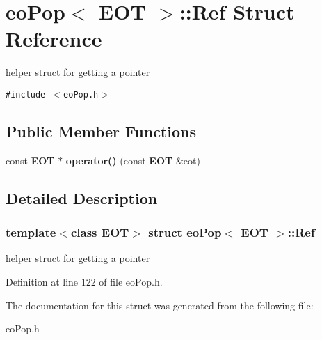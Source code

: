\section{eo\-Pop$<$ EOT $>$::Ref Struct Reference}
\label{structeo_pop_1_1_ref}
helper struct for getting a pointer  


{\tt \#include $<$eo\-Pop.h$>$}

\subsection*{Public Member Functions}
\begin{CompactItemize}
\item 
const {\bf EOT} $\ast$ {\bf operator()} (const {\bf EOT} \&eot)\label{structeo_pop_1_1_ref_a0}

\end{CompactItemize}


\subsection{Detailed Description}
\subsubsection*{template$<$class EOT$>$ struct eo\-Pop$<$ EOT $>$::Ref}

helper struct for getting a pointer 



Definition at line 122 of file eo\-Pop.h.

The documentation for this struct was generated from the following file:\begin{CompactItemize}
\item 
eo\-Pop.h\end{CompactItemize}
